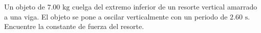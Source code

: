 \item Un objeto de $7.00\text{ kg}$ cuelga del extremo inferior de un resorte vertical amarrado a una viga. El objeto se pone a oscilar verticalmente con un periodo de $2.60\text{ s}$. Encuentre la constante de fuerza del resorte.